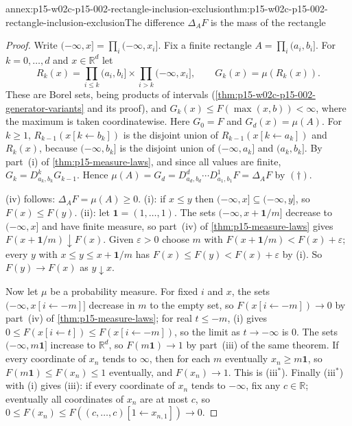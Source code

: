 \begin{annexitem}{annex:p15-w02c-p15-002-rectangle-inclusion-exclusion}{thm:p15-w02c-p15-002-rectangle-inclusion-exclusion}{The difference \(\Delta_AF\) is the mass of the rectangle}
\begin{proof}
Write \((-\infty,x]=\prod_i(-\infty,x_i]\). Fix a finite rectangle
\(A=\prod_i(a_i,b_i]\). For \(k=0,\ldots,d\) and \(x\in\mathbb R^d\) let
\[
 R_k(x)=\prod_{i\leq k}(a_i,b_i]\times\prod_{i>k}(-\infty,x_i],\qquad
 G_k(x)=\mu(R_k(x)) .
\]
These are Borel sets, being products of intervals
(\cref{thm:p15-w02c-p15-002-generator-variants} and its proof), and
\(G_k(x)\leq F(\max(x,b))<\infty\), where the maximum is taken
coordinatewise. Here \(G_0=F\) and \(G_d(x)=\mu(A)\). For \(k\geq1\),
\(R_{k-1}(x[k\gets b_k])\) is the disjoint union of
\(R_{k-1}(x[k\gets a_k])\) and \(R_k(x)\), because \((-\infty,b_k]\) is the
disjoint union of \((-\infty,a_k]\) and \((a_k,b_k]\). By part~(i) of
\cref{thm:p15-measure-laws}, and since all values are finite,
\(G_k=D^k_{a_k,b_k}G_{k-1}\). Hence
\(\mu(A)=G_d=D^d_{a_d,b_d}\cdots D^1_{a_1,b_1}F=\Delta_AF\) by
\((\dagger)\).

(iv) follows: \(\Delta_AF=\mu(A)\geq0\). (i): if \(x\leq y\) then
\((-\infty,x]\subseteq(-\infty,y]\), so \(F(x)\leq F(y)\). (ii): let
\(\mathbf 1=(1,\ldots,1)\). The sets \((-\infty,x+\mathbf1/m]\) decrease
to \((-\infty,x]\) and have finite measure, so part~(iv) of
\cref{thm:p15-measure-laws} gives \(F(x+\mathbf1/m)\downarrow F(x)\).
Given \(\varepsilon>0\) choose \(m\) with
\(F(x+\mathbf1/m)<F(x)+\varepsilon\); every \(y\) with
\(x\leq y\leq x+\mathbf1/m\) has \(F(x)\leq F(y)<F(x)+\varepsilon\) by
(i). So \(F(y)\to F(x)\) as \(y\downarrow x\).

Now let \(\mu\) be a probability measure. For fixed \(i\) and \(x\), the
sets \((-\infty,x[i\gets-m]]\) decrease in \(m\) to the empty set, so
\(F(x[i\gets-m])\to0\) by part~(iv) of \cref{thm:p15-measure-laws}; for
real \(t\leq-m\), (i) gives \(0\leq F(x[i\gets t])\leq F(x[i\gets-m])\), so
the limit as \(t\to-\infty\) is \(0\). The sets \((-\infty,m\mathbf1]\)
increase to \(\mathbb R^d\), so \(F(m\mathbf1)\to1\) by part~(iii) of the
same theorem. If every coordinate of \(x_n\) tends to \(\infty\), then for
each \(m\) eventually \(x_n\geq m\mathbf1\), so
\(F(m\mathbf1)\leq F(x_n)\leq1\) eventually, and \(F(x_n)\to1\). This is
(iii\(^*\)). Finally (iii\(^*\)) with (i) gives (iii): if every coordinate
of \(x_n\) tends to \(-\infty\), fix any \(c\in\mathbb R\); eventually all
coordinates of \(x_n\) are at most \(c\), so
\(0\leq F(x_n)\leq F((c,\ldots,c)[1\gets x_{n,1}])\to0\).
\end{proof}
\end{annexitem}

